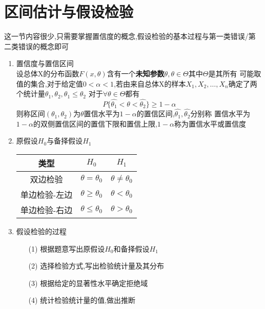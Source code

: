 \documentclass[12pt, a4paper, oneside, UTF8]{ctexbook}
\begin{document}
\section{区间估计与假设检验}
\begin{remark}[区间估计与假设检验]
    这一节内容很少,只需要掌握置信度的概念,假设检验的基本过程与第一类错误/第二类错误的概念即可
    \begin{enumerate}
        \item 置信度与置信区间 \\
        设总体X的分布函数$F(x,\theta)$含有一个\textbf{未知参数}$\theta,\theta\in\Theta$其中$\Theta$是其所有
        可能取值的集合,对于给定值$0<\alpha<1$,若由来自总体X的样本$X_1,X_2,\ldots,X_n$确定了两个统计量$\theta_1,\theta_2,\theta_1\leq\theta_2$
        对于$\forall\theta\in\Theta$都有
        $$
        P\{\hat{\theta_1} < \theta < \hat{\theta_2}\} \geq 1 - \alpha
        $$
        则称区间$(\theta_1,\theta_2)$为$\theta$置信水平为$1-\alpha$的置信区间,$\hat{\theta_1},\hat{\theta_2}$分别称
        置信水平为$1-\alpha$的双侧置信区间的置信下限和置信上限,$1-\alpha$称为置信水平或置信度
        \item 原假设$H_0$与备择假设$H_1$
        \begin{center}
        \begin{tabular}{|c|c|c|}
            \hline
            类型 & $H_0$ & $H_1$ \\
            \hline
            双边检验& $\theta=\theta_0$ & $\theta\neq\theta_0$ \\
            \hline
            单边检验-左边& $\theta\geq\theta_0$ & $\theta < \theta_0$ \\
            \hline
            单边检验-右边& $\theta\leq\theta_0$ & $\theta > \theta_0$ \\
            \hline
        \end{tabular}
        \end{center}

        \vspace{\baselineskip}

        \item 假设检验的过程 
        \begin{enumerate}
            \item [(1)] 根据题意写出原假设$H_0$和备择假设$H_1$
            \item [(2)] 选择检验方式,写出检验统计量及其分布
            \item [(3)] 根据给定的显著性水平确定拒绝域
            \item [(4)] 统计检验统计量的值,做出推断
        \end{enumerate}


\end{enumerate}
\end{remark}
\end{document}
